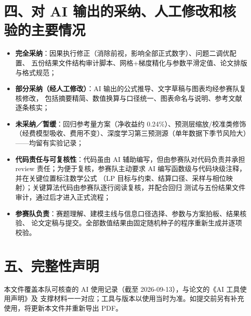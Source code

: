 \documentclass[a4paper,11pt]{ctexart}
\begin{document}
\section*{四、对 AI 输出的采纳、人工修改和核验的主要情况}
\begin{itemize}[leftmargin=2em,itemsep=2pt]
\item \textbf{完全采纳}：因果执行修正（消除前视，影响全部正式数字）、问题二调优配置、
五份结果文件结构审计脚本、网格+梯度精化与参数平滑定值、论文排版与格式规范；
\item \textbf{部分采纳（经人工修改）}：AI 输出的公式推导、文字草稿与图表均经参赛队复核修改，
包括摘要精简、数值换算与口径统一、图表命名与说明、参考文献逐条核实；
\item \textbf{未采纳／暂缓}：回归参考量方案（净收益约 0.24\%）、预测层缩放/校准类修饰
（经费模型吸收、费用不变）、深度学习第三预测源（单年数据下季节风险大）——均留有实验记录；
\item \textbf{代码责任与可复核性}：代码虽由 AI 辅助编写，但由参赛队对代码负责并承担 review
责任；为便于复核，参赛队主动要求 AI 编写函数级与代码块级注释，并在关键位置标注数学公式
（LP 目标与约束、结算口径、采样与相位映射）；关键算法代码由参赛队逐行阅读复核，并配合回归
测试与五份结果文件审计，通过后才进入正式流程；
\item \textbf{参赛队负责}：赛题理解、建模主线与信息口径选择、参数与方案拍板、结果核验、
论文定稿与提交。全部数值结果由固定随机种子的程序重新生成并逐项校验。
\end{itemize}

\section*{五、完整性声明}
本文件覆盖本队可核查的 AI 使用记录（截至 2026-09-13），与论文的《AI 工具使用声明》及
支撑材料一一对应；工具与版本以使用当时为准。如提交前另有补充使用，将更新本文件并重新导出 PDF。
\end{document}
